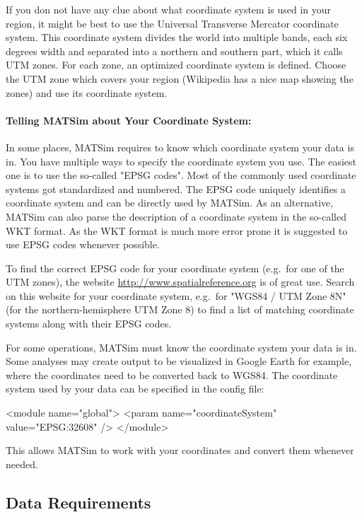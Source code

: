 If you don not have any clue about what coordinate system is used in your region, it might be best to use the Universal Transverse Mercator coordinate system. This coordinate system divides the world into multiple bands, each six degrees width and separated into a northern and southern part, which it calls UTM zones. For each zone, an optimized coordinate system is defined. Choose the UTM zone which covers your region (Wikipedia has a nice map showing the zones) and use its coordinate system. 

\paragraph{Telling MATSim about Your Coordinate System:}
In some places, MATSim requires to know which coordinate system your data is in. You have multiple ways to specify the coordinate system you use. The easiest one is to use the so-called "EPSG codes". Most of the commonly used coordinate systems got standardized and numbered. The EPSG code uniquely identifies a coordinate system and can be directly used by MATSim. As an alternative, MATSim can also parse the description of a coordinate system in the so-called WKT format. As the WKT format is much more error prone it is suggested to use EPSG codes whenever possible.

To find the correct EPSG code for your coordinate system (e.g.\ for one of the UTM zones), the website \url{http://www.spatialreference.org} is of great use. Search on this website for your coordinate system, e.g.\ for "WGS84 / UTM Zone 8N" (for the northern-hemisphere UTM Zone 8) to find a list of matching coordinate systems along with their EPSG codes.

For some operations, MATSim must know the coordinate system your data is in. Some analyses may create output to be visualized in Google Earth for example, where the coordinates need to be converted back to WGS84. The coordinate system used by your data can be specified in the config file:

\begin{xml}
<module name="global"> 
  <param name="coordinateSystem" value="EPSG:32608" /> 
</module>
\end{xml}

This allows MATSim to work with your coordinates and convert them whenever needed. 

\subsection{Data Requirements}
